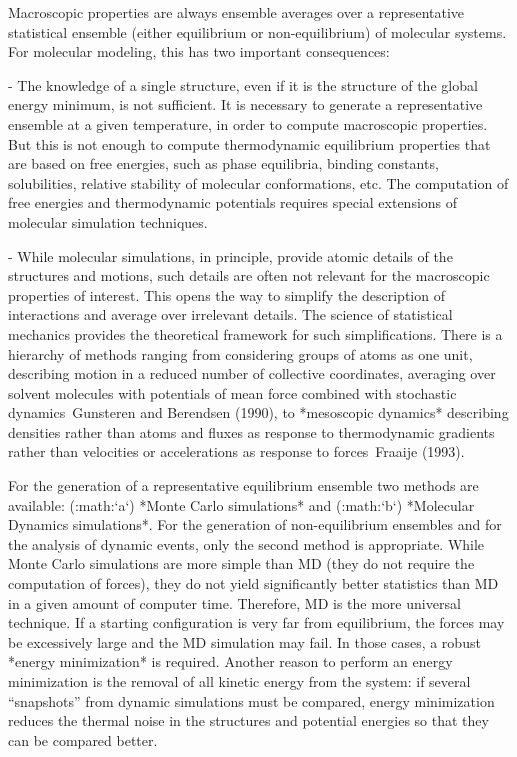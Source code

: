 Macroscopic properties are always ensemble averages over a
representative statistical ensemble (either equilibrium or
non-equilibrium) of molecular systems. For molecular modeling, this has
two important consequences:

-  The knowledge of a single structure, even if it is the structure of
   the global energy minimum, is not sufficient. It is necessary to
   generate a representative ensemble at a given temperature, in order
   to compute macroscopic properties. But this is not enough to compute
   thermodynamic equilibrium properties that are based on free energies,
   such as phase equilibria, binding constants, solubilities, relative
   stability of molecular conformations, etc. The computation of free
   energies and thermodynamic potentials requires special extensions of
   molecular simulation techniques.

-  While molecular simulations, in principle, provide atomic details of
   the structures and motions, such details are often not relevant for
   the macroscopic properties of interest. This opens the way to
   simplify the description of interactions and average over irrelevant
   details. The science of statistical mechanics provides the
   theoretical framework for such simplifications. There is a hierarchy
   of methods ranging from considering groups of atoms as one unit,
   describing motion in a reduced number of collective coordinates,
   averaging over solvent molecules with potentials of mean force
   combined with stochastic dynamics Gunsteren and Berendsen (1990), to
   *mesoscopic dynamics* describing densities rather than atoms and
   fluxes as response to thermodynamic gradients rather than velocities
   or accelerations as response to forces Fraaije (1993).

For the generation of a representative equilibrium ensemble two methods
are available: (:math:`a`) *Monte Carlo simulations* and (:math:`b`)
*Molecular Dynamics simulations*. For the generation of non-equilibrium
ensembles and for the analysis of dynamic events, only the second method
is appropriate. While Monte Carlo simulations are more simple than MD
(they do not require the computation of forces), they do not yield
significantly better statistics than MD in a given amount of computer
time. Therefore, MD is the more universal technique. If a starting
configuration is very far from equilibrium, the forces may be
excessively large and the MD simulation may fail. In those cases, a
robust *energy minimization* is required. Another reason to perform an
energy minimization is the removal of all kinetic energy from the
system: if several “snapshots” from dynamic simulations must be
compared, energy minimization reduces the thermal noise in the
structures and potential energies so that they can be compared better.

